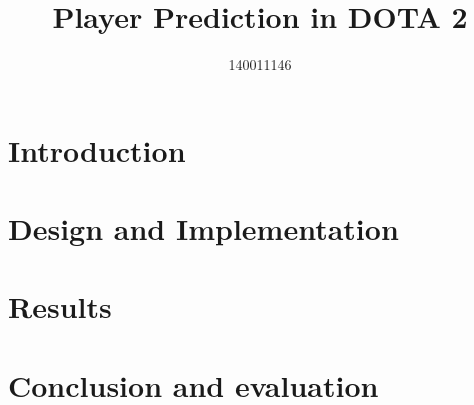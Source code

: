 \documentclass{sty/SizheArticle}
\title{Player Prediction in DOTA 2}
\author{140011146}
\begin{document}

\tableofcontents



\section{Introduction}

\section{Design and Implementation}

\section{Results}

\section{Conclusion and evaluation}

\end{document}
